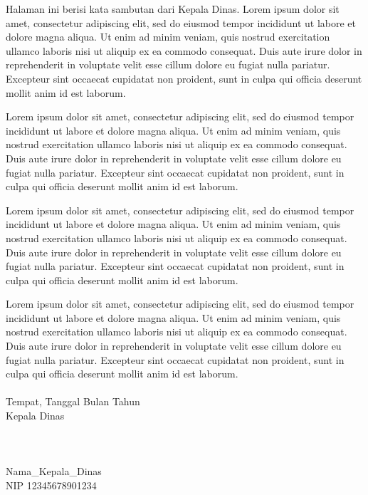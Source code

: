 Halaman ini berisi kata sambutan dari Kepala Dinas. Lorem ipsum dolor sit amet, consectetur adipiscing elit, sed do eiusmod tempor incididunt ut labore et dolore magna aliqua. Ut enim ad minim veniam, quis nostrud exercitation ullamco laboris nisi ut aliquip ex ea commodo consequat. Duis aute irure dolor in reprehenderit in voluptate velit esse cillum dolore eu fugiat nulla pariatur. Excepteur sint occaecat cupidatat non proident, sunt in culpa qui officia deserunt mollit anim id est laborum.

Lorem ipsum dolor sit amet, consectetur adipiscing elit, sed do eiusmod tempor incididunt ut labore et dolore magna aliqua. Ut enim ad minim veniam, quis nostrud exercitation ullamco laboris nisi ut aliquip ex ea commodo consequat. Duis aute irure dolor in reprehenderit in voluptate velit esse cillum dolore eu fugiat nulla pariatur. Excepteur sint occaecat cupidatat non proident, sunt in culpa qui officia deserunt mollit anim id est laborum.

Lorem ipsum dolor sit amet, consectetur adipiscing elit, sed do eiusmod tempor incididunt ut labore et dolore magna aliqua. Ut enim ad minim veniam, quis nostrud exercitation ullamco laboris nisi ut aliquip ex ea commodo consequat. Duis aute irure dolor in reprehenderit in voluptate velit esse cillum dolore eu fugiat nulla pariatur. Excepteur sint occaecat cupidatat non proident, sunt in culpa qui officia deserunt mollit anim id est laborum.

Lorem ipsum dolor sit amet, consectetur adipiscing elit, sed do eiusmod tempor incididunt ut labore et dolore magna aliqua. Ut enim ad minim veniam, quis nostrud exercitation ullamco laboris nisi ut aliquip ex ea commodo consequat. Duis aute irure dolor in reprehenderit in voluptate velit esse cillum dolore eu fugiat nulla pariatur. Excepteur sint occaecat cupidatat non proident, sunt in culpa qui officia deserunt mollit anim id est laborum.\\
\\
Tempat, Tanggal Bulan Tahun\\
Kepala Dinas\\
\\
\\
\\
Nama_Kepala_Dinas\\
NIP 12345678901234

\newpage{}

\pagestyle{fancy}

\tableofcontents
\clearpage{}
\listoffigures
\clearpage{}
\listoftables
\clearpage{} 
